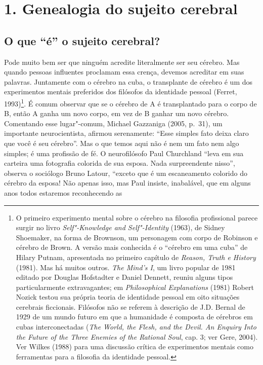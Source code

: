 \chapter{1. Genealogia do sujeito cerebral}

\section{O que ``é'' o sujeito cerebral?}

Pode muito bem ser que ninguém acredite literalmente ser seu cérebro.
Mas quando pessoas influentes proclamam essa crença, devemos acreditar
em suas palavras. Juntamente com o cérebro na cuba, o transplante de
cérebro é um dos experimentos mentais preferidos dos filósofos da
identidade pessoal (Ferret, 1993)\footnote[1]{O primeiro experimento mental sobre o cérebro na filosofia
profissional parece surgir no livro \emph{Self"-Knowledge and
Self"-Identity} (1963), de Sidney Shoemaker, na forma de Brownson, um
personagem com corpo de Robinson e cérebro de Brown. A versão mais
conhecida é o ``cérebro em uma cuba'' de Hilary Putnam, apresentada no
primeiro capítulo de \emph{Reason, Truth e History} (1981). Mas há
muitos outros. \emph{The Mind's I}, um livro popular de 1981 editado por
Douglas Hofstadter e Daniel Dennett, reuniu alguns tipos particularmente
extravagantes; em \emph{Philosophical Explanations} (1981) Robert Nozick
testou sua própria teoria de identidade pessoal em oito situações
cerebrais ficcionais. Filósofos não se referem à descrição de J.D.
Bernal de 1929 de um mundo futuro em que a humanidade é composta de
cérebros em cubas interconectadas (\emph{The World, the Flesh, and the
Devil. An Enquiry Into the Future of the Three Enemies of the Rational
Soul}, cap. 3; ver Gere, 2004). Ver Wilkes (1988) para uma discussão
crítica de experimentos mentais como ferramentas para a filosofia da
identidade pessoal.}. É comum observar
que se o cérebro de A é transplantado para o corpo de B, então A ganha
um novo corpo, em vez de B ganhar um novo cérebro. Comentando esse
lugar"-comum, Michael Gazzaniga (2005, p.~31), um importante
neurocientista, afirmou serenamente: ``Esse simples fato deixa claro que
você é seu cérebro''. Mas o que temos aqui não é nem um fato nem algo
simples; é uma profissão de fé. O neurofilósofo Paul Churchland ``leva
em sua carteira uma fotografia colorida de sua esposa. Nada
surpreendente nisso'', observa o sociólogo Bruno Latour, ``exceto que é
um escaneamento colorido do cérebro da esposa! Não apenas isso, mas Paul
insiste, inabalável, que em alguns anos todos estaremos reconhecendo as
